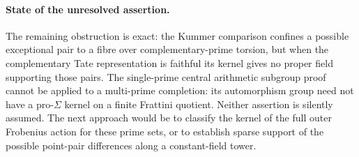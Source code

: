 \paragraph{State of the unresolved assertion.}

The remaining obstruction is exact: the Kummer comparison confines a
possible exceptional pair to a fibre over complementary-prime torsion,
but when the complementary Tate representation is faithful its kernel
gives no proper field supporting those pairs. The single-prime central
arithmetic subgroup proof cannot be applied to a multi-prime completion:
its automorphism group need not have a pro-\(\Sigma\) kernel on a finite
Frattini quotient. Neither assertion is silently assumed. The next
approach would be to classify the kernel of the full outer Frobenius
action for these prime sets, or to establish sparse support of the
possible point-pair differences along a constant-field tower.

